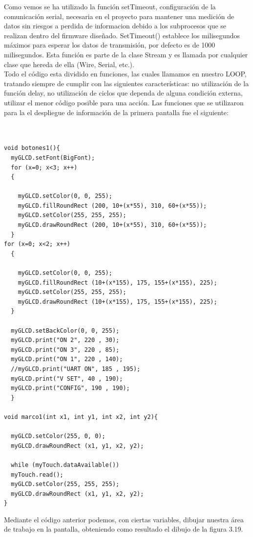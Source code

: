 Como vemos se ha utilizado la función setTimeout, configuración de la comunicación serial, necesaria en el proyecto para mantener una medición de datos sin riesgos a perdida de informacion debido a los subprocesos que se realizan dentro del firmware diseñado. SetTimeout() establece los milisegundos máximos para esperar los datos de transmisión, por defecto es de 1000 milisegundos. Esta función es parte de la clase Stream y es llamada por cualquier clase que hereda de ella (Wire, Serial, etc.). \cite{settime}\\


Todo el código esta dividido en funciones, las cuales llamamos en nuestro LOOP, tratando siempre de cumplir con las siguientes características: no utilización de la función delay, no utilización de ciclos que dependa de alguna condición externa, utilizar el menor código posible para una acción. Las funciones que se utilizaron para la el despliegue de información de la primera pantalla fue el siguiente:


\begin{verbatim}

 
void botones1(){ 
  myGLCD.setFont(BigFont); 
  for (x=0; x<3; x++)
  {
  
    myGLCD.setColor(0, 0, 255);
    myGLCD.fillRoundRect (200, 10+(x*55), 310, 60+(x*55));
    myGLCD.setColor(255, 255, 255);
    myGLCD.drawRoundRect (200, 10+(x*55), 310, 60+(x*55));
  }
for (x=0; x<2; x++)
  {
  
    myGLCD.setColor(0, 0, 255);
    myGLCD.fillRoundRect (10+(x*155), 175, 155+(x*155), 225);
    myGLCD.setColor(255, 255, 255);
    myGLCD.drawRoundRect (10+(x*155), 175, 155+(x*155), 225);
  }
  
  myGLCD.setBackColor(0, 0, 255);
  myGLCD.print("ON 2", 220 , 30);
  myGLCD.print("ON 3", 220 , 85);
  myGLCD.print("ON 1", 220 , 140);
  //myGLCD.print("UART ON", 185 , 195);
  myGLCD.print("V SET", 40 , 190);
  myGLCD.print("CONFIG", 190 , 190);
  }
  
void marco1(int x1, int y1, int x2, int y2){ 

  myGLCD.setColor(255, 0, 0);
  myGLCD.drawRoundRect (x1, y1, x2, y2);
  
  while (myTouch.dataAvailable())
  myTouch.read();
  myGLCD.setColor(255, 255, 255);
  myGLCD.drawRoundRect (x1, y1, x2, y2);
}
\end{verbatim}

Mediante el código anterior podemos, con ciertas variables, dibujar nuestra área de trabajo en la pantalla, obteniendo como resultado el dibujo de la figura 3.19.

